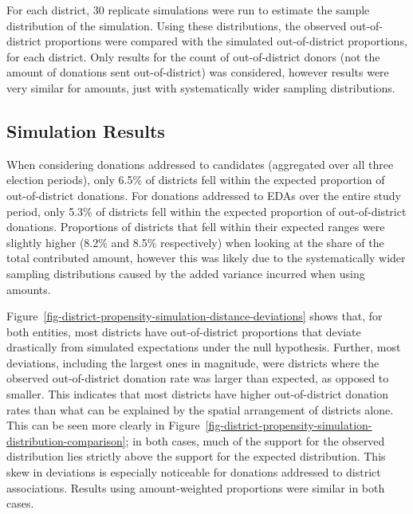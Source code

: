 \documentclass[
  letterpaper,
  DIV=11,
  numbers=noendperiod]{scrartcl}
\begin{document}
For each district, 30 replicate simulations were run to estimate the
sample distribution of the simulation. Using these distributions, the
observed out-of-district proportions were compared with the simulated
out-of-district proportions, for each district. Only results for the
count of out-of-district donors (not the amount of donations sent
out-of-district) was considered, however results were very similar for
amounts, just with systematically wider sampling distributions.

\subsection{Simulation Results}\label{simulation-results}

When considering donations addressed to candidates (aggregated over all
three election periods), only 6.5\% of districts fell within the
expected proportion of out-of-district donations. For donations
addressed to EDAs over the entire study period, only 5.3\% of districts
fell within the expected proportion of out-of-district donations.
Proportions of districts that fell within their expected ranges were
slightly higher (8.2\% and 8.5\% respectively) when looking at the share
of the total contributed amount, however this was likely due to the
systematically wider sampling distributions caused by the added variance
incurred when using amounts.

Figure~\ref{fig-district-propensity-simulation-distance-deviations}
shows that, for both entities, most districts have out-of-district
proportions that deviate drastically from simulated expectations under
the null hypothesis. Further, most deviations, including the largest
ones in magnitude, were districts where the observed out-of-district
donation rate was larger than expected, as opposed to smaller. This
indicates that most districts have higher out-of-district donation rates
than what can be explained by the spatial arrangement of districts
alone. This can be seen more clearly in
Figure~\ref{fig-district-propensity-simulation-distribution-comparison};
in both cases, much of the support for the observed distribution lies
strictly above the support for the expected distribution. This skew in
deviations is especially noticeable for donations addressed to district
associations. Results using amount-weighted proportions were similar in
both cases.
\end{document}
